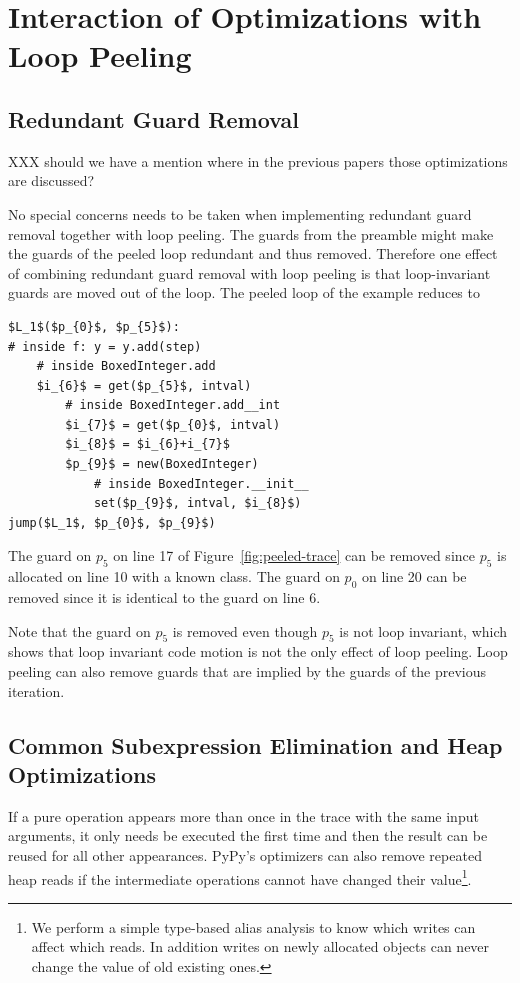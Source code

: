 \documentclass[preprint]{sigplanconf}
\begin{document}
\section{Interaction of Optimizations with Loop Peeling}

\subsection{Redundant Guard Removal}

XXX should we have a mention where in the previous papers those optimizations
are discussed?

No special concerns needs to be taken when implementing redundant
guard removal together with loop peeling. The guards from
the preamble might make the guards of the peeled loop
redundant and thus removed. Therefore one effect of combining redundant
guard removal with loop peeling is that loop-invariant guards are moved out of the
loop. The peeled loop of the example reduces to

\begin{lstlisting}[mathescape,numbers = right,basicstyle=\setstretch{1.05}\ttfamily\scriptsize]
$L_1$($p_{0}$, $p_{5}$):
# inside f: y = y.add(step)
    # inside BoxedInteger.add
    $i_{6}$ = get($p_{5}$, intval)
        # inside BoxedInteger.add__int
        $i_{7}$ = get($p_{0}$, intval)
        $i_{8}$ = $i_{6}+i_{7}$
        $p_{9}$ = new(BoxedInteger)
            # inside BoxedInteger.__init__
            set($p_{9}$, intval, $i_{8}$)
jump($L_1$, $p_{0}$, $p_{9}$)
\end{lstlisting}

The guard on $p_5$ on line 17 of Figure~\ref{fig:peeled-trace} can be
removed since $p_5$ is allocated on line 10 with a known class. The
guard on $p_0$ on line 20 can be removed since it is identical to the
guard on line 6.

Note that the guard on $p_5$ is removed even though $p_5$ is not loop
invariant, which shows that loop invariant code motion is not the only
effect of loop peeling. Loop peeling can also remove guards that are implied by
the guards of the previous iteration.



\subsection{Common Subexpression Elimination and Heap Optimizations}

If a pure operation appears more than once in the trace with the same input
arguments, it only needs be executed the first time and then the result
can be reused for all other appearances. PyPy's optimizers can also remove
repeated heap reads if the intermediate operations cannot have changed their
value\footnote{We perform a simple type-based alias analysis to know which
writes can affect which reads. In addition writes on newly allocated objects
can never change the value of old existing ones.}.
\end{document}
